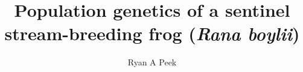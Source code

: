 \documentclass[twoside,12pt,final]{ucthesis-CA2012} %
\begin{document}
\begin{ucfrontmatter}


  \title{Population genetics of a sentinel stream-breeding frog (\emph{Rana
boylii})}
  \author{Ryan A Peek}
   
  \othermemberC{} %
	
	\maketitle
	

  
    \begin{dedication}

      \vspace*{20ex} %
      \begin{center}
      \begin{large} %


\end{large}
\end{center}
\end{dedication}
\end{ucfrontmatter}
\end{document}
